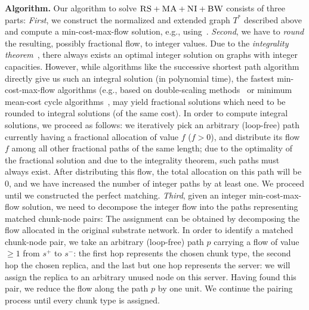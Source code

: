 \documentclass[preprint,12pt]{elsarticle}
\newcommand{\Source}{\ensuremath{s^{+}}}
\newcommand{\Sink}{\ensuremath{s^{-}}}
\newcommand{\CC}{\textsc{NI}}
\newcommand{\RS}{\textsc{RS}}
\newcommand{\BW}{\textsc{BW}}
\newcommand{\MA}{\textsc{MA}}
\newcommand{\Tree}{\ensuremath{T}}
\begin{document}
\textbf{Algorithm.}
Our algorithm to solve $\RS+\MA+\CC+\BW$ consists of three parts:
\emph{First}, we construct the normalized and extended graph $\Tree^*$
described above and compute
a min-cost-max-flow solution, e.g.,
using~\cite{mincostmaxflow-1,mincostmaxflow-2}.
\emph{Second}, we have to \emph{round} the resulting, possibly fractional flow, to
integer values. Due to the \emph{integrality theorem}~\cite{flow-book},
there always exists an optimal integer solution on graphs with integer capacities.
However, while algorithms like the successive shortest path algorithm~\cite{successive_shortest_path_complexity}
directly give us such an integral solution (in polynomial time), the fastest min-cost-max-flow algorithms (e.g., based on double-scaling
methods~\cite{mincostmaxflow-1} or minimum mean-cost cycle
algorithms~\cite{mincostmaxflow-2}, may yield fractional solutions
which need to be rounded to integral solutions (of the same cost).
In order to compute integral solutions, we proceed as follows: we iteratively
pick an arbitrary (loop-free) path
currently having a fractional allocation of value $f$ ($f>0$), and distribute its flow $f$
among all other fractional paths of the same length; due to the optimality of the fractional solution
and due to the integrality theorem, such paths must always exist. After distributing this flow,
the total allocation on this path will be 0, and we have increased the number of
integer paths by at least one. We proceed until we constructed the perfect
matching.
\emph{Third}, given an integer min-cost-max-flow solution, we need to decompose
the integer flow into the paths
representing matched chunk-node pairs:
The assignment can be obtained by decomposing the flow allocated in the
original substrate network. In order to identify a matched chunk-node pair,
we take an arbitrary (loop-free) path $p$ carrying a flow of value  $\geq 1$ from $\Source$ to $\Sink$:
the first hop represents the chosen chunk type, the second hop the chosen
replica, and the last but one hop represents the server: we will assign
the replica to an arbitrary unused node on this server.
Having found this pair, we reduce the flow
along the path $p$ by one unit.
We continue the pairing process until every chunk type is assigned.
\end{document}
